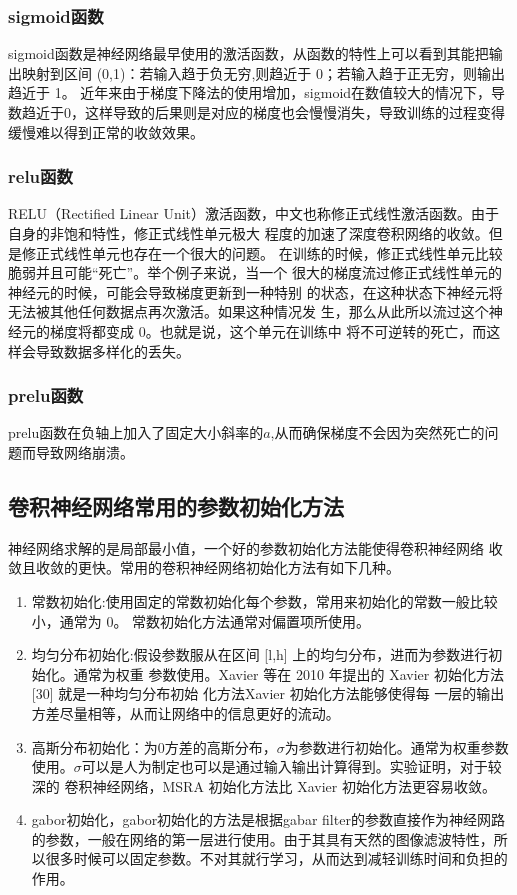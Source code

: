\subsubsection{sigmoid函数}
sigmoid函数是神经网络最早使用的激活函数，从函数的特性上可以看到其能把输出映射到区间 (0,1)：若输入趋于负无穷,则趋近于 0；若输入趋于正无穷，则输出趋近于 1。
近年来由于梯度下降法的使用增加，sigmoid在数值较大的情况下，导数趋近于0，这样导致的后果则是对应的梯度也会慢慢消失，导致训练的过程变得缓慢难以得到正常的收敛效果。
\subsubsection{relu函数}
RELU（Rectified Linear Unit）激活函数，中文也称修正式线性激活函数。由于自身的非饱和特性，修正式线性单元极大 程度的加速了深度卷积网络的收敛。但是修正式线性单元也存在一个很大的问题。 在训练的时候，修正式线性单元比较脆弱并且可能“死亡”。举个例子来说，当一个 很大的梯度流过修正式线性单元的神经元的时候，可能会导致梯度更新到一种特别 的状态，在这种状态下神经元将无法被其他任何数据点再次激活。如果这种情况发 生，那么从此所以流过这个神经元的梯度将都变成 0。也就是说，这个单元在训练中 将不可逆转的死亡，而这样会导致数据多样化的丢失。
\subsubsection{prelu函数}
prelu函数在负轴上加入了固定大小斜率的$a$,从而确保梯度不会因为突然死亡的问题而导致网络崩溃。


\subsection{卷积神经网络常用的参数初始化方法}
神经网络求解的是局部最小值，一个好的参数初始化方法能使得卷积神经网络 收敛且收敛的更快。常用的卷积神经网络初始化方法有如下几种。
\begin{enumerate}
\item 常数初始化:使用固定的常数初始化每个参数，常用来初始化的常数一般比较小，通常为 0。 常数初始化方法通常对偏置项所使用。
\item 均匀分布初始化:假设参数服从在区间 [l,h] 上的均匀分布，进而为参数进行初始化。通常为权重 参数使用。Xavier 等在 2010 年提出的 Xavier 初始化方法[30] 就是一种均匀分布初始 化方法Xavier 初始化方法能够使得每 一层的输出方差尽量相等，从而让网络中的信息更好的流动。

\item 高斯分布初始化：为0方差的高斯分布，$\sigma$为参数进行初始化。通常为权重参数使用。$\sigma$可以是人为制定也可以是通过输入输出计算得到。实验证明，对于较深的 卷积神经网络，MSRA 初始化方法比 Xavier 初始化方法更容易收敛。

\item gabor初始化，gabor初始化的方法是根据gabar filter的参数直接作为神经网路的参数，一般在网络的第一层进行使用。由于其具有天然的图像滤波特性，所以很多时候可以固定参数。不对其就行学习，从而达到减轻训练时间和负担的作用。
\end{enumerate}

